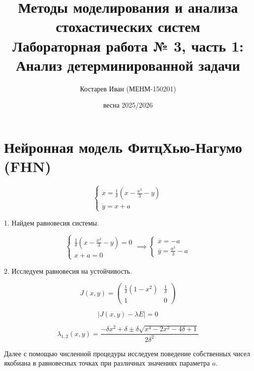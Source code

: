 \documentclass[17pt]{article}
\title{
    \textbf{Методы моделирования и анализа стохастических систем} \\
    \large Лабораторная работа № 3, часть 1: \\
    Анализ детерминированной задачи
}
\author{Костарев Иван (МЕНМ-150201)}
\date{весна 2025/2026}
\begin{document}
\maketitle
\tableofcontents
\newpage




\section{Нейронная модель ФитцХью-Нагумо (FHN)}

$$
\begin{cases}
    \dot{x} = \frac{1}{\delta} (x - \frac{x^3}{3} - y) \\
    \dot{y} = x + a
\end{cases}
$$

1. Найдем равновесия системы.

$$
\begin{cases}
    \frac{1}{\delta} (x - \frac{x^3}{3} - y) = 0 \\
    x + a = 0
\end{cases} \implies
\begin{cases}
    \overline{x} = -a \\
    \overline{y} = \frac{a^3}{3} - a
\end{cases}
$$

2. Исследуем равновесия на устойчивость.

$$
J(x, y) = \begin{pmatrix}
    \frac{1}{\delta} (1 - x^2) & \frac{1}{\delta} \\
    1 & 0
\end{pmatrix}
$$

$$
|J(x, y) - \lambda E| = 0
$$

$$
\lambda_{1,2}(x, y) = \frac{-\delta x^2 + \delta \pm \delta \sqrt{x^4 - 2 x^2 - 4 \delta + 1}}{2 \delta^2}
$$

Далее с помощью численной процедуры исследуем поведение собственных чисел якобиана в равновесных точках при различных значениях параметра $a$.
\end{document}
